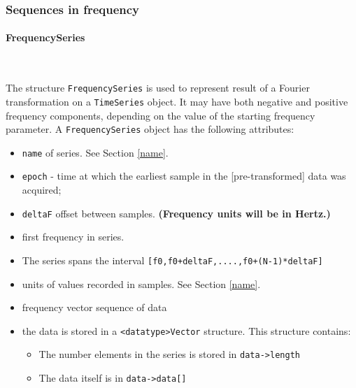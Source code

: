 \documentclass[]{ligodcc}
\renewcommand{\texttt}[1]{{\ttfamily\color{blue}#1}}
\begin{document}
\subsubsection{Sequences in frequency}

\paragraph{{\texttt {FrequencySeries}} }~


The structure {\tt FrequencySeries} is used to represent result of a Fourier
transformation on a {\tt TimeSeries} object. It may have both negative and
positive frequency components, depending on the value of the starting
frequency parameter. A {\tt FrequencySeries} object has the following
attributes:

\begin{itemize}
\vspace{-0.15in}
\item
{\tt name} of series. See Section \ref{name}.
\vspace{-0.15in}
\item
{\tt epoch} - time at which the earliest sample in 
the [pre-transformed] data was acquired;
\vspace{-0.15in}
\item
{\tt deltaF} offset between samples.  {\bf (Frequency units will be in Hertz.)}
\vspace{-0.15in}
\item
first frequency in series. 
\vspace{-0.15in}
\item
The series spans the interval {\tt [f0,f0+deltaF,....,f0+(N-1)*deltaF] }
\vspace{-0.15in}
\item
units of values recorded in samples. See Section \ref{name}.
\vspace{-0.15in}
\item
frequency vector sequence of data
\vspace{-0.15in}
\item
the data is stored in a {\tt <datatype>Vector}  structure. This structure contains:
\begin{itemize}
\vspace{-0.10in}
\item
The number elements in the series is stored in {\tt data->length}
\vspace{-0.10in}
\item
The data itself is in {\tt data->data[]}
\end{itemize}
\end{itemize}
\end{document}
